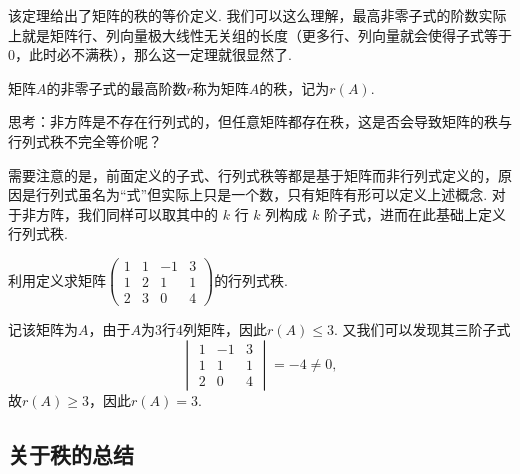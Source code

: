 该定理给出了矩阵的秩的等价定义. 我们可以这么理解，最高非零子式的阶数实际上就是矩阵行、列向量极大线性无关组的长度（更多行、列向量就会使得子式等于0，此时必不满秩），那么这一定理就很显然了.

\begin{definition}{}{}
    矩阵$A$的非零子式的最高阶数$r$称为矩阵$A$的秩，记为$r(A)$.
\end{definition}

思考：非方阵是不存在行列式的，但任意矩阵都存在秩，这是否会导致矩阵的秩与行列式秩不完全等价呢？

需要注意的是，前面定义的子式、行列式秩等都是基于矩阵而非行列式定义的，原因是行列式虽名为``式''但实际上只是一个数，只有矩阵有形可以定义上述概念. 对于非方阵，我们同样可以取其中的 $k$ 行 $k$ 列构成 $k$ 阶子式，进而在此基础上定义行列式秩.

\begin{example}{}{}
    利用定义求矩阵$\begin{pmatrix}
            1 & 1 & -1 & 3 \\ 1 & 2 & 1 & 1 \\ 2 & 3 & 0 & 4
        \end{pmatrix}$的行列式秩.
\end{example}

\begin{solution}
    记该矩阵为$A$，由于$A$为3行4列矩阵，因此$r(A)\leqslant 3$. 又我们可以发现其三阶子式
    \[\begin{vmatrix}
            1 & -1 & 3 \\ 1 & 1 & 1 \\ 2 & 0 & 4
        \end{vmatrix}=-4\neq 0,\]
    故$r(A)\geqslant 3$，因此$r(A)=3$.
\end{solution}

\subsection{关于秩的总结}

